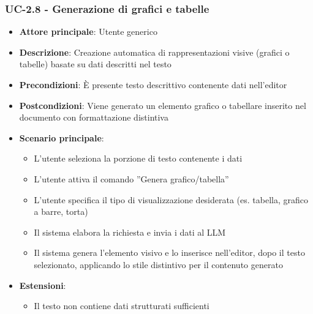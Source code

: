 \documentclass[11pt,a4paper]{article}
\begin{document}
\subsubsection{UC-2.8 - Generazione di grafici e tabelle}
\begin{itemize}
    \item \textbf{Attore principale}: Utente generico
    \item \textbf{Descrizione}: Creazione automatica di rappresentazioni visive (grafici o tabelle) basate su dati descritti nel testo
    \item \textbf{Precondizioni}: È presente testo descrittivo contenente dati nell’editor
    \item \textbf{Postcondizioni}: Viene generato un elemento grafico o tabellare inserito nel documento con formattazione distintiva
    \item \textbf{Scenario principale}:
    \begin{itemize}
    \item L’utente seleziona la porzione di testo contenente i dati
    \item L’utente attiva il comando ”Genera grafico/tabella”
    \item L’utente specifica il tipo di visualizzazione desiderata (es. tabella, grafico a barre, torta)
    \item Il sistema elabora la richiesta e invia i dati al LLM
    \item Il sistema genera l'elemento visivo e lo inserisce nell'editor, dopo il testo selezionato, applicando lo stile distintivo per il contenuto generato
    \end{itemize}
    \item \textbf{Estensioni}:
    \begin{itemize}
        \item Il testo non contiene dati strutturati sufficienti
    \end{itemize}
\end{itemize}
\end{document}
